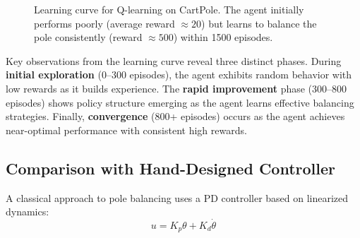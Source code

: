 \begin{figure}[htbp]
\centering
{}
\caption{Learning curve for Q-learning on CartPole. The agent initially performs poorly (average reward $\approx 20$) but learns to balance the pole consistently (reward $\approx 500$) within 1500 episodes.}
\label{fig:learning_curve}
\end{figure}

Key observations from the learning curve reveal three distinct phases. During \textbf{initial exploration} (0--300 episodes), the agent exhibits random behavior with low rewards as it builds experience. The \textbf{rapid improvement} phase (300--800 episodes) shows policy structure emerging as the agent learns effective balancing strategies. Finally, \textbf{convergence} (800+ episodes) occurs as the agent achieves near-optimal performance with consistent high rewards.

\subsection{Comparison with Hand-Designed Controller}

A classical approach to pole balancing uses a PD controller based on linearized dynamics:
\begin{equation}
u = K_p \theta + K_d \dot{\theta}
\end{equation}

